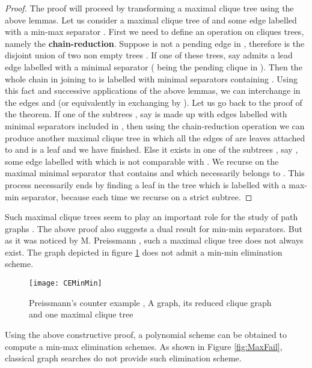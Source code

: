 \documentclass{endm}
\begin{document}
\begin{proof}
The proof will proceed by transforming a maximal clique tree using the above lemmas.
Let us consider    a maximal clique tree of  and   some edge  labelled with a min-max separator .
First we need to define an operation on cliques trees, namely the \textbf{chain-reduction}. Suppose  is not a pending edge in , therefore  is the disjoint union of two non empty trees . If one of these trees, say  admits a lead edge  labelled with a minimal separator  ( being the pending clique in ). Then the whole chain in  joining  to  is labelled with minimal separators containing . Using this fact and successive applications of the above lemmas, we can interchange in  the edges  and  (or equivalently in  exchanging  by ).
Let us go back to the proof of the theorem. If one of the subtrees , say  is made up with edges labelled with  minimal separators included in , then using the chain-reduction operation we can produce another maximal clique tree  in which all the edges of  are leaves attached to  and  is a leaf and we have finished.
Else it exists in one of the subtrees , say , some edge  labelled with  which is not comparable with .
We recurse on the maximal minimal separator that contains  and which necessarily belongs to . This process necessarily ends by finding a leaf in the tree which is labelled with a max-min separator, because each time we recurse  on a strict subtree.
\end{proof}
Such maximal clique trees seem to play an important role for the study of path graphs \cite{LMP08}.
The above proof also suggests a dual result for min-min separators.
But as it was noticed by M. Preissmann \cite{Preissmann09},  such a maximal clique tree does not always 
exist. The graph depicted in figure \ref{fig:CEMinMin} does not admit a min-min elimination scheme.


\begin{figure}[h!]
	\begin{center}
		\texttt{[image: CEMinMin]}
	\caption{Preissmann's counter example \cite{Preissmann09}, A graph, its reduced clique graph and one maximal 
	clique tree}
	\label{fig:CEMinMin}
	\end{center}
\end{figure}





Using the above constructive proof, a polynomial scheme can be obtained to compute a min-max elimination schemes. As shown in Figure \ref{fig:MaxFail}, classical graph searches do not provide such elimination scheme.
\end{document}
